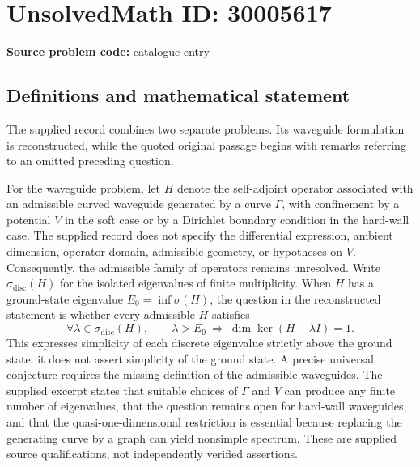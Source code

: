 \documentclass[11pt]{article}
\begin{document}
\section*{UnsolvedMath ID: 30005617}
\textbf{Source problem code:} catalogue entry
\subsection{Definitions and mathematical statement}
The supplied record combines two separate problems. Its waveguide formulation is reconstructed, while the quoted original passage begins with remarks referring to an omitted preceding question.

For the waveguide problem, let \(H\) denote the self-adjoint operator associated with an admissible curved waveguide generated by a curve \(\Gamma\), with confinement by a potential \(V\) in the soft case or by a Dirichlet boundary condition in the hard-wall case. The supplied record does not specify the differential expression, ambient dimension, operator domain, admissible geometry, or hypotheses on \(V\). Consequently, the admissible family of operators remains unresolved. Write \(\sigma_{\mathrm{disc}}(H)\) for the isolated eigenvalues of finite multiplicity. When \(H\) has a ground-state eigenvalue \(E_0=\inf\sigma(H)\), the question in the reconstructed statement is whether every admissible \(H\) satisfies
\[
\forall\lambda\in\sigma_{\mathrm{disc}}(H),\qquad
\lambda>E_0\ \Longrightarrow\ \dim\ker(H-\lambda I)=1.
\]
This expresses simplicity of each discrete eigenvalue strictly above the ground state; it does not assert simplicity of the ground state. A precise universal conjecture requires the missing definition of the admissible waveguides. The supplied excerpt states that suitable choices of \(\Gamma\) and \(V\) can produce any finite number of eigenvalues, that the question remains open for hard-wall waveguides, and that the quasi-one-dimensional restriction is essential because replacing the generating curve by a graph can yield nonsimple spectrum. These are supplied source qualifications, not independently verified assertions.
\end{document}
